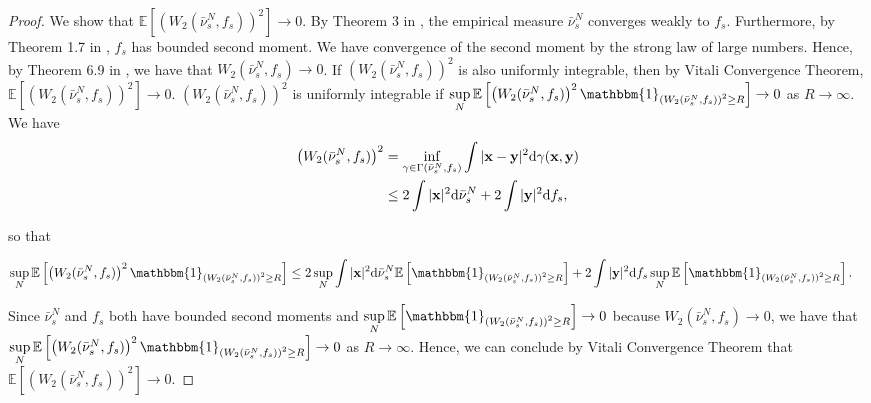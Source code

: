 \begin{proof}
We show that $\mathbb E \left[\left(W_2(\bar{\nu}^N_s,f_s)\right)^2\right] \to 0$. By Theorem 3 in \cite{varadarajan1958convergence}, the empirical measure $\bar{\nu}^N_s$ converges weakly to $f_s$. Furthermore, by Theorem 1.7 in \cite{carmona2016lectures}, $f_s$ has bounded second moment. We have convergence of the second moment by the strong law of large numbers. Hence, by Theorem 6.9 in \cite{villani2008optimal}, we have that $W_2(\bar{\nu}^N_s,f_s) \to 0$. If $\left(W_2(\bar{\nu}^N_s,f_s)\right)^2$ is also uniformly integrable, then by Vitali Convergence Theorem, $\mathbb E \left[\left(W_2(\bar{\nu}^N_s,f_s)\right)^2\right] \to 0$. $\left(W_2(\bar{\nu}^N_s,f_s)\right)^2$ is uniformly integrable if $\sup\limits_N\mathbb{E} \left[\left(W_2(\bar{\nu}^N_s,f_s)\right)^2 \mathbbm{1} _{\left(W_2(\bar{\nu}^N_s,f_s)\right)^2\geq R}\right] \to 0$  as $R\to \infty$. We have  
\begin{equation*}
\begin{aligned}
\left(W_2(\bar{\nu}^N_s,f_s)\right)^2 &= \inf_{\gamma\in\Gamma(\bar{\nu}^N_s, f_s)} \int |\mathbf{x}-\mathbf{y}|^2 \mathrm{d} \gamma(\mathbf{x},\mathbf{y})\\
&\leq 2 \int |\mathbf{x}|^2 \mathrm{d} \bar{\nu}^N_s + 2 \int |\mathbf{y}|^2 \mathrm{d} f_s,
\end{aligned}
\end{equation*}

so that

\begin{equation*}
\begin{aligned}
\sup\limits_N\mathbb E \left[\left(W_2(\bar{\nu}^N_s,f_s)\right)^2 \mathbbm{1}_{\left(W_2(\bar{\nu}^N_s,f_s)\right)^2\geq R}\right] &\leq 2 \sup\limits_N\int |\bx|^2 \intd \bar{\nu}^N_s \mathbb E \left[ \mathbbm{1}_{\left(W_2(\bar{\nu}^N_s,f_s)\right)^2\geq R}\right] + 2 \int |\by|^2 \intd f_s \sup\limits_N\mathbb E \left[\mathbbm{1}_{\left(W_2(\bar{\nu}^N_s,f_s)\right)^2\geq R}\right].
\end{aligned}
\end{equation*}

Since $\bar{\nu}^N_s$ and $f_s$ both have bounded second moments and $\sup\limits_N\mathbb E \left[\mathbbm{1}_{\left(W_2(\bar{\nu}^N_s,f_s)\right)^2\geq R}\right] \to 0$ because $W_2(\bar{\nu}^N_s , f_s) \to 0$, we have that $\sup\limits_N\mathbb E \left[\left(W_2(\bar{\nu}^N_s,f_s)\right)^2 \mathbbm{1}_{\left(W_2(\bar{\nu}^N_s,f_s)\right)^2\geq R}\right] \to 0$ as $R\to \infty$. Hence, we can conclude by Vitali Convergence Theorem that $\mathbb E \left[\left(W_2(\bar{\nu}^N_s,f_s)\right)^2\right] \to 0$.


\end{proof}
